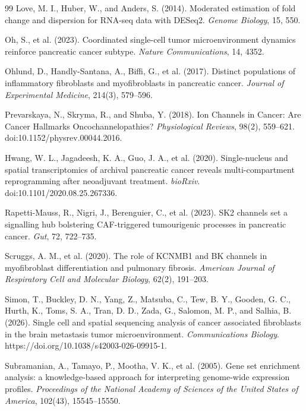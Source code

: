 \documentclass[11pt,a4paper]{article}
\begin{document}
\begin{thebibliography}{99}
Love, M. I., Huber, W., and Anders, S. (2014). Moderated estimation of fold change and dispersion for RNA-seq data with DESeq2. \textit{Genome Biology}, 15, 550.

Oh, S., et al. (2023). Coordinated single-cell tumor microenvironment dynamics reinforce pancreatic cancer subtype. \textit{Nature Communications}, 14, 4352.

Ohlund, D., Handly-Santana, A., Biffi, G., et al. (2017). Distinct populations of inflammatory fibroblasts and myofibroblasts in pancreatic cancer. \textit{Journal of Experimental Medicine}, 214(3), 579--596.

Prevarskaya, N., Skryma, R., and Shuba, Y. (2018). Ion Channels in Cancer: Are Cancer Hallmarks Oncochannelopathies? \textit{Physiological Reviews}, 98(2), 559--621. doi:10.1152/physrev.00044.2016.

Hwang, W. L., Jagadeesh, K. A., Guo, J. A., et al. (2020). Single-nucleus and spatial transcriptomics of archival pancreatic cancer reveals multi-compartment reprogramming after neoadjuvant treatment. \textit{bioRxiv}. doi:10.1101/2020.08.25.267336.

Rapetti-Mauss, R., Nigri, J., Berenguier, C., et al. (2023). SK2 channels set a signalling hub bolstering CAF-triggered tumourigenic processes in pancreatic cancer. \textit{Gut}, 72, 722--735.

Scruggs, A. M., et al. (2020). The role of KCNMB1 and BK channels in myofibroblast differentiation and pulmonary fibrosis. \textit{American Journal of Respiratory Cell and Molecular Biology}, 62(2), 191--203.

Simon, T., Buckley, D. N., Yang, Z., Matsuba, C., Tew, B. Y., Gooden, G. C., Hurth, K., Toms, S. A., Tran, D. D., Zada, G., Salomon, M. P., and Salhia, B. (2026). Single cell and spatial sequencing analysis of cancer associated fibroblasts in the brain metastasis tumor microenvironment. \textit{Communications Biology}. https://doi.org/10.1038/s42003-026-09915-1.

Subramanian, A., Tamayo, P., Mootha, V. K., et al. (2005). Gene set enrichment analysis: a knowledge-based approach for interpreting genome-wide expression profiles. \textit{Proceedings of the National Academy of Sciences of the United States of America}, 102(43), 15545--15550.


\end{thebibliography}
\end{document}
